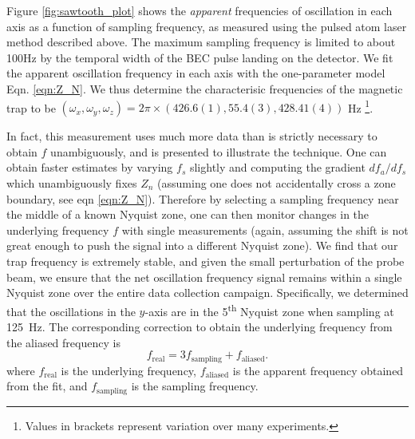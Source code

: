 	Figure \ref{fig:sawtooth_plot} shows the \emph{apparent} frequencies of oscillation in each axis as a function of sampling frequency, as measured using the pulsed atom laser method described above.
	The maximum sampling frequency is limited to about 100Hz by the temporal width of the BEC pulse landing on the detector. We fit the apparent oscillation frequency in each axis with the one-parameter model Eqn. \ref{eqn:Z_N}. We thus determine the characterisic frequencies of the magnetic trap to be $(\omega_x,\omega_y,\omega_z)= 2\pi\times(426.6(1),55.4(3),428.41(4))$ Hz \footnote{Values in brackets represent variation over many experiments.}.

	In fact, this measurement uses much more data than is strictly necessary to obtain $f$ unambiguously, and is presented to illustrate the technique. 
	One can obtain faster estimates by varying $f_s$ slightly and computing the gradient $df_a/df_s$ which unambiguously fixes $Z_n$ (assuming one does not accidentally cross a zone boundary, see eqn \ref{eqn:Z_N}).
	Therefore by selecting a sampling frequency near the middle of a known Nyquist zone, one can then monitor changes in the underlying frequency $f$ with single measurements (again, assuming the shift is not great enough to push the signal into a different Nyquist zone).
	We find that our trap frequency is extremely stable, and given the small perturbation of the probe beam, we ensure that the net oscillation frequency signal remains within a single Nyquist zone  over the entire data collection campaign. 
	Specifically, we determined that the oscillations in the \(y\)-axis are in the 5\textsuperscript{th} Nyquist zone when sampling at 125~Hz. The corresponding correction to obtain the underlying frequency from the aliased frequency is
	\begin{equation}
	    f_{\text{real}}=3 f_{\text{sampling}} + f_{\text{aliased}}.
	\end{equation}
	where \(f_{\text{real}}\) is the underlying frequency, \(f_{\text{aliased}}\) is the apparent frequency obtained from the fit, and \(f_{\text{sampling}}\) is the sampling frequency. 


